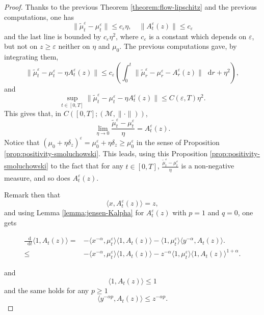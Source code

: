 \documentclass[a4paper,11pt, reqno]{amsart}
\newcommand{\cM}{\mathcal{M}}	\newcommand{\MM}{\mathbbm{M}}
\newcommand{\eps}{\varepsilon}
\newcommand{\dd}{\mathop{}\!\mathrm{d}}
\newcommand{\1}{\mathbbm{1}}
\theoremstyle{plain}
\theoremstyle{definition}
\begin{document}
\begin{proof}
  Thanks to the previous Theorem \ref{theorem:flow-lipschitz} and the previous
  computations, one has
  \[ \| \tilde{\mu}^{\eps}_t - \mu^{\eps}_t \| \le
     c_{\eps} \eta, \quad \| A_t^{\eps} (z) \| \le
     c_{\eps} \]
  and the last line is bounded by $c_{\eps} \eta^2$, where
  $c_{\eps}$ is a constant which depends on $\eps$, but not on
  $z \ge \eps$ neither on $\eta$ and $\mu_0$. The previous
  computations gave, by integrating them,
  \[ \| \tilde{\mu}^{\eps}_t - \mu^{\eps}_t - \eta
     A^{\eps}_t (z) \| \le c_{\eps} \left( \int_0^t \|
     \tilde{\mu}^{\eps}_r - \mu^{\eps}_r - A^{\eps}_r (z)
     \| \dd r + \eta^2 \right), \]
  and
  \[ \underset{t \in [0, T]}{\sup} \| \tilde{\mu}^{\eps}_t -
     \mu^{\eps}_t - \eta A^{\eps}_t (z) \| \le C
     (\eps, T) \eta^2 . \]
  This gives that, in $C ([0, T] ; (\cM, \| \cdot \|))$,
  \[ \underset{\eta \rightarrow 0}{\lim} \frac{\tilde{\mu}^{\eps}_t -
     \mu^{\eps}_t}{\eta} = A^{\eps}_t (z) . \]
  Notice that $(\mu_0 + \eta \delta_z)^{\eps} = \mu_0^{\eps} +
  \eta \delta_z \ge \mu_0^{\eps}$ in the sense of Proposition
  \ref{prop:positivity-smoluchowski}. This leads, using this Proposition
  \ref{prop:positivity-smoluchowski} to the fact that for any $t \in [0, T]$,
  $\frac{\tilde{\mu}^{\eps}_t - \mu^{\eps}_t}{\eta}$ is a
  non-negative measure, and so does $A^{\eps}_t (z)$.
  
  Remark then that
  \[ \langle x, A^{\eps}_t (z) \rangle = z, \]
  and using Lemma \ref{lemma:jensen-Kalpha} for $A^{\eps}_t (z)$ with
  $p = 1$ and $q = 0$, one gets
  
  \begin{align*}
    \frac{\dd}{\dd t} \langle 1, A_t (z) \rangle = & - \langle x^{-
    \alpha}, \mu^{\eps}_t \rangle \langle 1, A_t (z) \rangle - \langle
    1, \mu^{\eps}_t \rangle \langle y^{- \alpha}, A_t (z) \rangle .\\
    \le & - \langle x^{- \alpha}, \mu^{\eps}_t \rangle \langle 1,
    A_t (z) \rangle - z^{- \alpha} \langle 1, \mu^{\eps}_t \rangle
    \langle 1, A_t (z) \rangle^{1 + \alpha} .
  \end{align*}
  
  and
  \[ \langle 1, A_t (z) \rangle \le 1 \]
  and the same holds for any $p \ge 1$
  \[ \langle y^{- \alpha p}, A_t (z) \rangle \le z^{- \alpha p} . \]
  
\end{proof}
\end{document}
